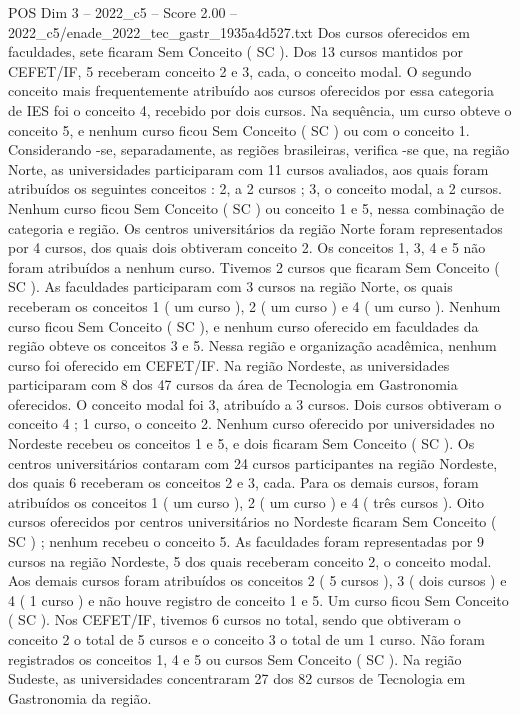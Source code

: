 \begin{textsample}{POS Dim 3 – 2022\_c5 – Score 2.00 – 2022\_c5/enade\_2022\_tec\_gastr\_1935a4d527.txt}
Dos cursos oferecidos em faculdades, sete ficaram Sem Conceito ( SC ).
Dos 13 cursos mantidos por CEFET/IF, 5 receberam conceito 2 e 3, cada, o conceito modal.
O segundo conceito mais frequentemente atribuído aos cursos oferecidos por essa categoria de IES foi o conceito 4, recebido por dois cursos.
Na sequência, um curso obteve o conceito 5, e nenhum curso ficou Sem Conceito ( SC ) ou com o conceito 1.
Considerando -se, separadamente, as regiões brasileiras, verifica -se que, na região Norte, as universidades participaram com 11 cursos avaliados, aos quais foram atribuídos os seguintes conceitos : 2, a 2 cursos ; 3, o conceito modal, a 2 cursos.
Nenhum curso ficou Sem Conceito ( SC ) ou conceito 1 e 5, nessa combinação de categoria e região.
Os centros universitários da região Norte foram representados por 4 cursos, dos quais dois obtiveram conceito 2.
Os conceitos 1, 3, 4 e 5 não foram atribuídos a nenhum curso.
Tivemos 2 cursos que ficaram Sem Conceito ( SC ).
As faculdades participaram com 3 cursos na região Norte, os quais receberam os conceitos 1 ( um curso ), 2 ( um curso ) e 4 ( um curso ).
Nenhum curso ficou Sem Conceito ( SC ), e nenhum curso oferecido em faculdades da região obteve os conceitos 3 e 5.
Nessa região e organização acadêmica, nenhum curso foi oferecido em CEFET/IF.
Na região Nordeste, as universidades participaram com 8 dos 47 cursos da área de Tecnologia em Gastronomia oferecidos.
O conceito modal foi 3, atribuído a 3 cursos.
Dois cursos obtiveram o conceito 4 ; 1 curso, o conceito 2.
Nenhum curso oferecido por universidades no Nordeste recebeu os conceitos 1 e 5, e dois ficaram Sem Conceito ( SC ).
Os centros universitários contaram com 24 cursos participantes na região Nordeste, dos quais 6 receberam os conceitos 2 e 3, cada.
Para os demais cursos, foram atribuídos os conceitos 1 ( um curso ), 2 ( um curso ) e 4 ( três cursos ).
Oito cursos oferecidos por centros universitários no Nordeste ficaram Sem Conceito ( SC ) ; nenhum recebeu o conceito 5.
As faculdades foram representadas por 9 cursos na região Nordeste, 5 dos quais receberam conceito 2, o conceito modal.
Aos demais cursos foram atribuídos os conceitos 2 ( 5 cursos ), 3 ( dois cursos ) e 4 ( 1 curso ) e não houve registro de conceito 1 e 5.
Um curso ficou Sem Conceito ( SC ).
Nos CEFET/IF, tivemos 6 cursos no total, sendo que obtiveram o conceito 2 o total de 5 cursos e o conceito 3 o total de um 1 curso.
Não foram registrados os conceitos 1, 4 e 5 ou cursos Sem Conceito ( SC ).
Na região Sudeste, as universidades concentraram 27 dos 82 cursos de Tecnologia em Gastronomia da região.

\end{textsample}
